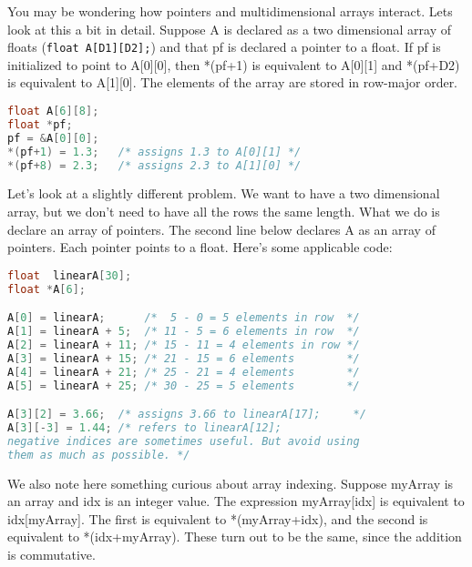 You may be wondering how pointers and multidimensional arrays interact. Lets
look at this a bit in detail. Suppose A is declared as a two dimensional array
of floats (\texttt{float A[D1][D2];}) and that pf is declared a pointer to a
float. If pf is initialized to point to A[0][0], then *(pf+1) is equivalent to
A[0][1] and *(pf+D2) is equivalent to A[1][0]. The elements of the array are
stored in row-major order.
\lstset{basicstyle=\scriptsize, numbers=left, captionpos=b, tabsize=4}
\begin{lstlisting}[caption=Section \thesection listing \arabic{pntcnt},language={C},
breaklines=true,xleftmargin=15pt,label=lst:section\thesection listing\arabic{pntcnt}]
float A[6][8];
float *pf;
pf = &A[0][0]; 
*(pf+1) = 1.3;   /* assigns 1.3 to A[0][1] */
*(pf+8) = 2.3;   /* assigns 2.3 to A[1][0] */
\end{lstlisting}
	
Let's look at a slightly different problem. We want to have a two dimensional
array, but we don't need to have all the rows the same length. What we do is
declare an array of pointers. The second line below declares A as an array of
pointers. Each pointer points to a float. Here's some applicable code:
\lstset{basicstyle=\scriptsize, numbers=left, captionpos=b, tabsize=4}
\begin{lstlisting}[caption=Section \thesection listing \arabic{pntcnt},language={C},
breaklines=true,xleftmargin=15pt,label=lst:section\thesection listing\arabic{pntcnt}]
float  linearA[30];
float *A[6];

A[0] = linearA;      /*  5 - 0 = 5 elements in row  */
A[1] = linearA + 5;  /* 11 - 5 = 6 elements in row  */
A[2] = linearA + 11; /* 15 - 11 = 4 elements in row */
A[3] = linearA + 15; /* 21 - 15 = 6 elements        */
A[4] = linearA + 21; /* 25 - 21 = 4 elements        */
A[5] = linearA + 25; /* 30 - 25 = 5 elements        */

A[3][2] = 3.66;  /* assigns 3.66 to linearA[17];     */
A[3][-3] = 1.44; /* refers to linearA[12];           
negative indices are sometimes useful. But avoid using 
them as much as possible. */
\end{lstlisting}

We also note here something curious about array indexing. Suppose myArray is an
array and idx is an integer value. The expression myArray[idx] is equivalent to
idx[myArray]. The first is equivalent to *(myArray+idx), and the second is
equivalent to *(idx+myArray). These turn out to be the same, since the addition
is commutative.

